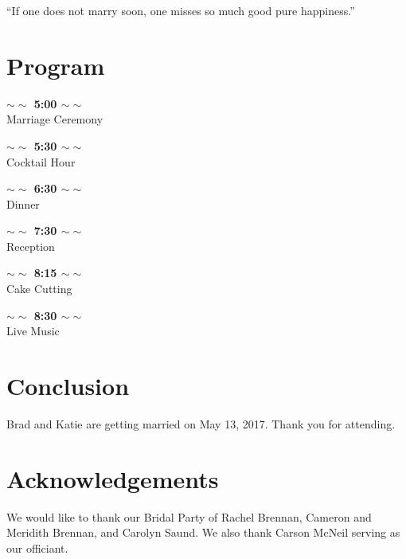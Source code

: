 \documentclass[letterpaper, 11 pt, conference]{ieeeconf}
\newcommand{\programSpace}{\vspace{0.2in}}
\newcommand{\programTime}[1]{\textbf{$\sim\sim$ #1 $\sim\sim$}}
\begin{document}
``If one does not marry soon, one misses so much good pure happiness.''\cite{Darwin}


\vspace{1.5in}

\section{Program}
\programSpace
\begin{center}
  \programTime{5:00}\\
  Marriage Ceremony\\
  \programSpace

  \programTime{5:30}\\
  Cocktail Hour\\
  \programSpace

  \programTime{6:30}\\
  Dinner\\
  \programSpace

  \programTime{7:30}\\
  Reception
  \programSpace

  \programTime{8:15}\\
  Cake Cutting
  \programSpace

  \programTime{8:30}\\
  Live Music
  \programSpace

\end{center}
\section{Conclusion}
Brad and Katie are getting married on May 13, 2017.
Thank you for attending.

\section{Acknowledgements}
We would like to thank our Bridal Party of Rachel Brennan, Cameron and Meridith Brennan, and Carolyn Saund.
We also thank Carson McNeil serving as our officiant.



\end{document}
